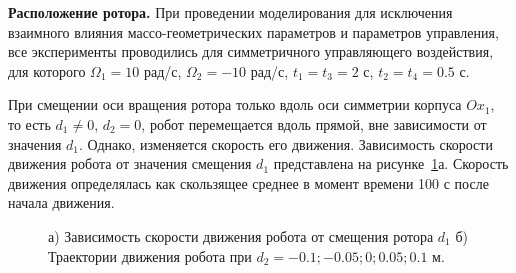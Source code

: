 

\textbf{Расположение ротора.} 
При проведении моделирования для исключения взаимного влияния массо-геометрических параметров и параметров управления, все эксперименты проводились для симметричного управляющего воздействия, для которого $ \Omega_1 = 10 $ рад/с, $ \Omega_2 = -10 $ рад/с, $t_1=t_3=2$ с, $ t_2 = t_4 = 0.5 $ с.

При смещении оси вращения ротора только вдоль оси симметрии корпуса $ Ox_1 $, то есть $ d_1 \neq 0 $, $ d_2=0 $, робот перемещается вдоль прямой, вне зависимости от значения $ d_1 $. Однако, изменяется скорость его движения. Зависимость скорости движения робота от значения смещения $ d_1 $ представлена на рисунке~\ref{Plotd}а. Скорость движения определялась как скользящее среднее в момент времени 100 с после начала движения.

\begin{figure}[!ht]
	\begin{minipage}[h]{0.35\linewidth}
	\end{minipage}
	\hfill
	\begin{minipage}[h]{0.65\linewidth}
	\end{minipage}
	\vfill
	\begin{minipage}[h]{0.35\linewidth}
	\end{minipage}
	\hfill
	\begin{minipage}[h]{0.65\linewidth}
	\end{minipage} 	
	\caption{ а) Зависимость скорости движения робота от смещения ротора $ d_1 $ б) Траектории движения робота при $ d_2 = -0.1; -0.05; 0; 0.05; 0.1$ м.}
	\label{Plotd}
\end{figure}


